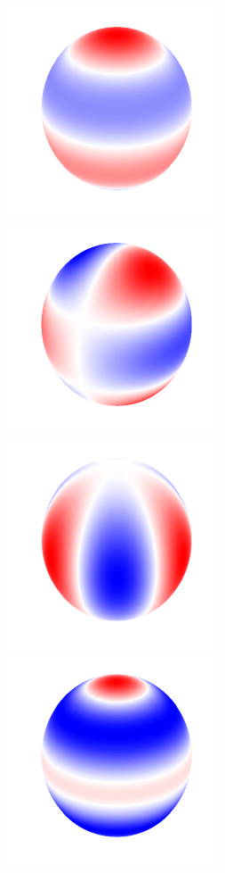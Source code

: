 \documentclass[a4paper, 12pt]{book}
\begin{document}
\begin{figure}[bt]
\centering
\includegraphics{./fig-spherical-harmonic-n3-k0.pdf}
\includegraphics{./fig-spherical-harmonic-n3-k1.pdf}
\includegraphics{./fig-spherical-harmonic-n3-k3.pdf}
\includegraphics{./fig-spherical-harmonic-n4-k0.pdf}

\end{figure}
\end{document}
